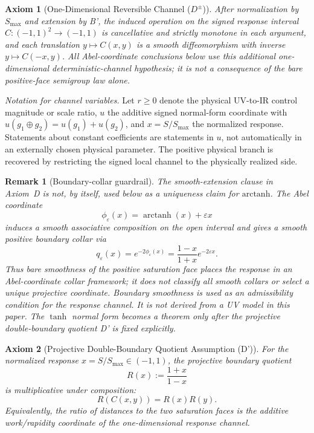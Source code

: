 \documentclass[aps,prd,twocolumn,superscriptaddress,nofootinbib]{revtex4-2}
\newtheorem{remark}{Remark}
\newtheorem{axiom}{Axiom}
\begin{document}
\begin{axiom}[One-Dimensional Reversible Channel ($D^\pm$)]
\label{ax:reversible_channel}
After normalization by $S_{\max}$ and extension by B', the induced operation on the signed response interval $C:(-1,1)^2\to(-1,1)$ is cancellative and strictly monotone in each argument, and each translation $y\mapsto C(x,y)$ is a smooth diffeomorphism with inverse $y\mapsto C(-x,y)$. All Abel-coordinate conclusions below use this additional one-dimensional deterministic-channel hypothesis; it is not a consequence of the bare positive-face semigroup law alone.
\end{axiom}

\textit{Notation for channel variables.} Let $r\geq0$ denote the physical UV-to-IR control magnitude or scale ratio, $u$ the additive signed normal-form coordinate with $u(g_1\oplus g_2)=u(g_1)+u(g_2)$, and $x=S/S_{\max}$ the normalized response. Statements about constant coefficients are statements in $u$, not automatically in an externally chosen physical parameter. The positive physical branch is recovered by restricting the signed local channel to the physically realized side.

\begin{remark}[Boundary-collar guardrail]
The smooth-extension clause in Axiom~D is not, by itself, used below as a uniqueness claim for $\mathrm{arctanh}$. The Abel coordinate
\[
  \phi_\varepsilon(x)=\operatorname{arctanh}(x)+\varepsilon x
\]
induces a smooth associative composition on the open interval and gives a smooth positive boundary collar via
\[
  q_\varepsilon(x)=e^{-2\phi_\varepsilon(x)}
  =\frac{1-x}{1+x}e^{-2\varepsilon x}.
\]
Thus bare smoothness of the positive saturation face places the response in an Abel-coordinate collar framework; it does not classify all smooth collars or select a unique projective coordinate. Boundary smoothness is used as an admissibility condition for the response channel. It is not derived from a UV model in this paper. The $\tanh$ normal form becomes a theorem only after the projective double-boundary quotient D' is fixed explicitly.
\end{remark}

\begin{axiom}[Projective Double-Boundary Quotient Assumption (D')]
\label{ax:projective_quotient}
For the normalized response $x=S/S_{\max}\in(-1,1)$, the projective boundary quotient
\[
  R(x):=\frac{1+x}{1-x}
\]
is multiplicative under composition:
\begin{equation}
  R(C(x,y))=R(x)R(y).
  \label{eq:projective_quotient}
\end{equation}
Equivalently, the ratio of distances to the two saturation faces is the additive work/rapidity coordinate of the one-dimensional response channel.
\end{axiom}
\end{document}
